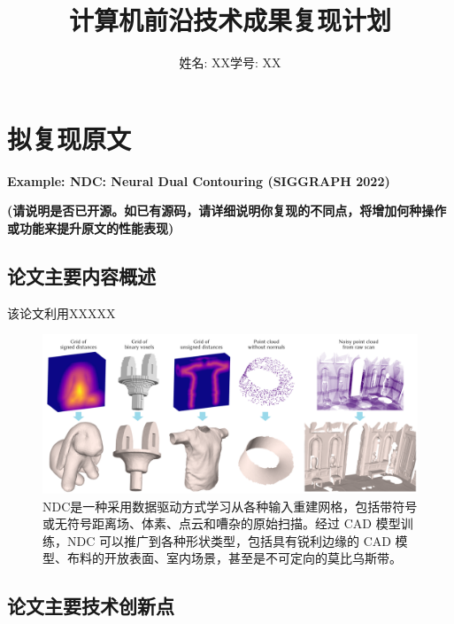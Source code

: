 \documentclass[UTF8,12pt]{article} %
\newcommand*{\heiti}{\CJKfamily{zhhei}}   %
\newcommand*{\kaiti}{\CJKfamily{zhkai}}  %
\begin{document}
\renewcommand{\figurename}{图}
\renewcommand{\tablename}{表}
\renewcommand{\refname}{参考文献}

\title{\bf{\heiti 计算机前沿技术成果复现计划}}
\author{\normalsize{姓名: XX}\hspace{2cm}\normalsize{学号: XX}}
\date{}
\maketitle



\section{拟复现原文}

\textbf{Example: NDC: Neural Dual Contouring (SIGGRAPH 2022)}

\textbf{\textcolor[rgb]{1,0,0}{(请说明是否已开源。如已有源码，请详细说明你复现的不同点，将增加何种操作或功能来提升原文的性能表现)}}


\subsection{论文主要内容概述}

该论文利用XXXXX

\begin{figure}[ht]
  \centering
  \includegraphics[scale=0.4]{figs/fig1.png}
  \caption{NDC是一种采用数据驱动方式学习从各种输入重建网格，包括带符号或无符号距离场、体素、点云和嘈杂的原始扫描。经过 CAD 模型训练，NDC 可以推广到各种形状类型，包括具有锐利边缘的 CAD 模型、布料的开放表面、室内场景，甚至是不可定向的莫比乌斯带。}
  \label{fig:enc-dec}
\end{figure}

\subsection{论文主要技术创新点}
\end{document}
